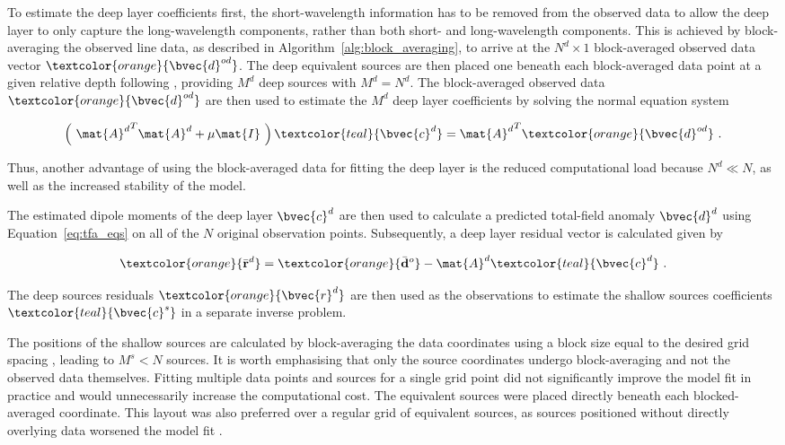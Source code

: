 To estimate the deep layer coefficients first, the short-wavelength information has to be removed from the observed data to allow the deep layer to only capture the long-wavelength components, rather than both short- and long-wavelength components. This is achieved by block-averaging the observed line data, as described in Algorithm~\ref{alg:block_averaging}, to arrive at the $N^d \times 1$ block-averaged observed data vector $\textcolor{orange}{\bvec{d}^{od}}$. The deep equivalent sources are then placed one beneath each block-averaged data point at a given relative depth following \citet{Soler2021}, providing $M^d$ deep sources with $M^d = N^d$. The block-averaged observed data $\textcolor{orange}{\bvec{d}^{od}}$ are then used to estimate the $M^d$ deep layer coefficients by solving the normal equation system

\begin{equation}
    \left(\ {\mat{A}^d}^T \mat{A}^d + \mu \mat{I}\ \right)
    \textcolor{teal}{\bvec{c}^d} =
    {\mat{A}^d}^T\textcolor{orange}{\bvec{d}^{od}}
    \ .
\end{equation}

\noindent
Thus, another advantage of using the block-averaged data for fitting the deep layer is the reduced computational load because $N^d \ll N$, as well as the increased stability of the model.

The estimated dipole moments of the deep layer \textcolor{teal}{$\bvec{c}^d$} are then used to calculate a predicted total-field anomaly \textcolor{orange}{$\bvec{d}^d$} using Equation~\ref{eq:tfa_eqs} on all of the $N$ original observation points. Subsequently, a deep layer residual vector is calculated given by

\begin{equation}
    \textcolor{orange}{\bar{\mathbf{r}}^d} =
    \textcolor{orange}{\bar{\mathbf{d}}^o} - \mat{A}^d \textcolor{teal}{\bvec{c}^d}
    \ .
    \label{eq:deep_residual}
\end{equation}

\noindent
The deep sources residuals $\textcolor{orange}{\bvec{r}^d}$ are then used as the observations to estimate the shallow sources coefficients $\textcolor{teal}{\bvec{c}^s}$ in a separate inverse problem.

The positions of the shallow sources are calculated by block-averaging the data coordinates using a block size equal to the desired grid spacing \citep{Soler2021}, leading to $M^s < N$ sources. It is worth emphasising that only the source coordinates undergo block-averaging and not the observed data themselves. Fitting multiple data points and sources for a single grid point did not significantly improve the model fit in practice and would unnecessarily increase the computational cost. The equivalent sources were placed directly beneath each blocked-averaged coordinate. This layout was also preferred over a regular grid of equivalent sources, as sources positioned without directly overlying data worsened the model fit \citep{Soler2021}.


